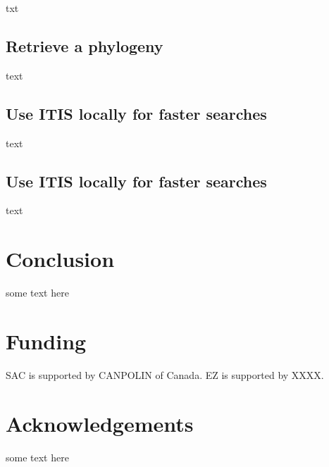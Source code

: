 \documentclass[letterpaper,superscriptaddress,showkeys,longbibliography]{revtex4-1}
\begin{document}
txt

\subsection{Retrieve a phylogeny}

text

\subsection{Use ITIS locally for faster searches}

text

\subsection{Use ITIS locally for faster searches}

text

\section{Conclusion}

some text here

\section{Funding}

SAC is supported by CANPOLIN of Canada. EZ is supported by XXXX.

\section{Acknowledgements}

some text here

\newpage

\end{document}
